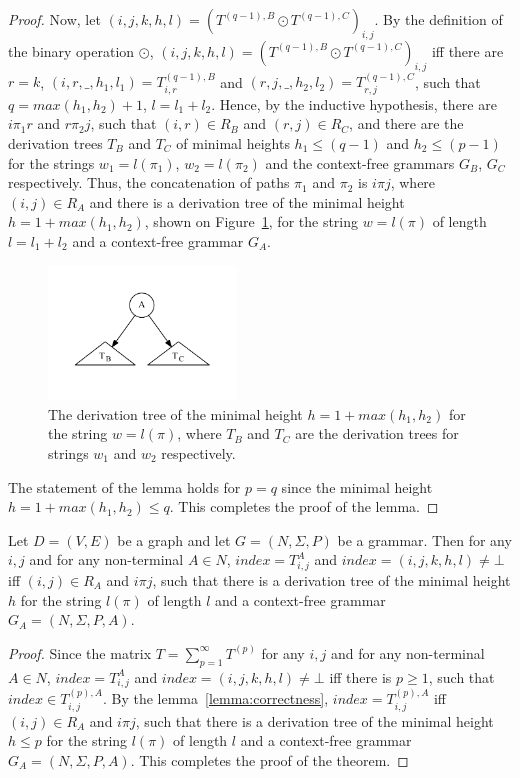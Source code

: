 \begin{proof}
	Now, let $(i,j,k,h,l) = (T^{(q-1),B} \odot T^{(q-1),C})_{i,j}$. By the definition of the binary operation $\odot$, $(i,j,k,h,l) = (T^{(q-1),B} \odot T^{(q-1),C})_{i,j}$ iff there are $r=k$, $(i,r,\_,h_1,l_1) = T^{(q-1),B}_{i,r}$ and $(r,j,\_,h_2,l_2) = T^{(q-1),C}_{r,j}$, such that $q = max(h_1, h_2) + 1$, $l = l_1 + l_2$. Hence, by the inductive hypothesis, there are $i \pi_1 r$ and $r \pi_2 j$, such that $(i,r) \in R_B$ and $(r,j) \in R_C$, and there are the derivation trees $T_B$ and $T_C$ of minimal heights $h_1 \leq (q-1)$ and $h_2 \leq (p-1)$ for the strings $w_1 = l(\pi_1)$, $w_2 = l(\pi_2)$ and the context-free grammars $G_B$, $G_C$ respectively. Thus, the concatenation of paths $\pi_1$ and $\pi_2$ is $i \pi j$, where $(i,j) \in R_A$ and there is a derivation tree of the minimal height $h = 1 + max(h_1, h_2)$, shown on Figure~\ref{tree2}, for the string $w = l(\pi)$ of length $l = l_1 + l_2$ and a context-free grammar $G_A$.
	\begin{figure}[h!]
		\centering
		\includegraphics[width=5cm]{pictures/tree2.pdf}
		\caption{The derivation tree of the minimal height $h = 1 + max(h_1, h_2)$ for the string $w = l(\pi)$, where $T_B$ and $T_C$ are the derivation trees for strings $w_1$ and $w_2$ respectively.}
		\label{tree2}
	\end{figure}
	
	The statement of the lemma holds for $p = q$ since the minimal height $h = 1 + max(h_1, h_2) \leq q$. This completes the proof of the lemma.
\end{proof}

\begin{mytheorem}\label{thm:correct}
	Let $D = (V,E)$ be a graph and let $G =(N,\Sigma,P)$ be a grammar. Then for any $i, j$ and for any non-terminal $A \in N$, $index = T^A_{i,j}$ and $index = (i,j,k,h,l) \neq \bot$ iff $(i,j) \in R_A$ and $i \pi j$, such that there is a derivation tree of the minimal height $h$ for the string $l(\pi)$ of length $l$ and a context-free grammar $G_A = (N,\Sigma,P,A)$.
\end{mytheorem}
\begin{proof}
	
	Since the matrix $T = \sum_{p = 1}^{\infty} T^{(p)}$ for any $i, j$ and for any non-terminal $A \in N$, $index = T^A_{i,j}$ and $index = (i,j,k,h,l) \neq \bot$ iff there is $p \geq 1$, such that $index \in T^{(p),A}_{i,j}$. By the lemma~\ref{lemma:correctness}, $index = T^{(p),A}_{i,j}$ iff $(i,j) \in R_A$ and $i \pi j$, such that there is a derivation tree of the minimal height $h \leq p$ for the string $l(\pi)$  of length $l$ and a context-free grammar $G_A = (N,\Sigma,P,A)$. This completes the proof of the theorem.
\end{proof}

